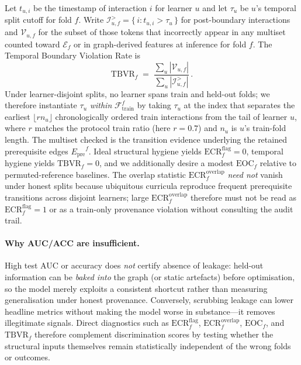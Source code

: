 \documentclass[pdflatex,sn-basic]{sn-jnl}
\newcommand{\Epre}{\ensuremath{E_{\text{pre}}}}
\begin{document}
Let $t_{u,i}$ be the timestamp of interaction $i$ for learner $u$ and
let $\tau_u$ be $u$'s temporal split cutoff for fold $f$. Write
$\mathcal{I}_{u,f}^{>}=\{\, i : t_{u,i}>\tau_u \,\}$ for post-boundary
interactions and $\mathcal{V}_{u,f}$ for the subset of those tokens that
incorrectly appear in any multiset counted toward $\mathcal{E}_f$ or in
graph-derived features at inference for fold $f$. The Temporal
Boundary Violation Rate is
\begin{equation}
\mathrm{TBVR}_f \;=\;
\frac{\sum_u |\mathcal{V}_{u,f}|}{\sum_u |\mathcal{I}_{u,f}^{>}|}\,.
\label{eq:tbvr}
\end{equation}
Under learner-disjoint splits, no learner spans train and held-out folds;
we therefore instantiate $\tau_u$ \emph{within}
$\mathcal{F}_{\text{train}}^f$ by taking $\tau_u$ at the index that
separates the earliest $\lfloor r n_u\rfloor$ chronologically ordered
train interactions from the tail of learner $u$, where $r$ matches the
protocol train ratio (here $r{=}0.7$) and $n_u$ is $u$'s train-fold length.
The multiset checked is the transition evidence underlying the retained
prerequisite edges $\Epre^f$.
Ideal structural hygiene yields $\mathrm{ECR}^{\mathrm{flag}}_f{=}0$, temporal hygiene yields $\mathrm{TBVR}_f{=}0$, and we additionally desire a modest $\mathrm{EOC}_f$ relative to permuted-reference baselines.
The overlap statistic $\mathrm{ECR}^{\mathrm{overlap}}_f$ \emph{need not} vanish under honest splits because ubiquitous curricula reproduce frequent prerequisite transitions across disjoint learners; large $\mathrm{ECR}^{\mathrm{overlap}}_f$ therefore must not be read as $\mathrm{ECR}^{\mathrm{flag}}_f{=}1$ or as a train-only provenance violation without consulting the audit trail.

\paragraph{Why AUC/ACC are insufficient.}
High test AUC or accuracy does \emph{not} certify absence of leakage:
held-out information can be \emph{baked into} the graph (or static
artefacts) before optimisation, so the model merely exploits a
consistent shortcut rather than measuring generalisation under honest
provenance. Conversely, scrubbing leakage can lower headline metrics
without making the model worse in substance---it removes illegitimate
signals. Direct diagnostics such as $\mathrm{ECR}^{\mathrm{flag}}_f$, $\mathrm{ECR}^{\mathrm{overlap}}_f$, $\mathrm{EOC}_f$,
and $\mathrm{TBVR}_f$ therefore complement discrimination scores by
testing whether the structural inputs themselves remain statistically
independent of the wrong folds or outcomes.
\end{document}
